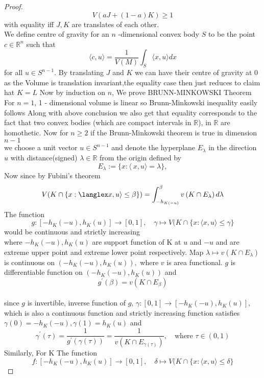 \documentclass[oneside]{book}
\begin{document}
\begin{proof}
\[
V(a J+(1-a) K) \geq 1
\]
with equality iff $J, K$ are translates of each other.
\\
 We define centre of gravity for an $n$ -dimensional convex body $S$ to be the point $c \in \mathbb{R}^{n}$ such that
\[
\langle c, u\rangle=\frac{1}{V(M)} \int_{S}\langle x, u\rangle d x
\]
for all $u \in S^{n-1} .$ \newpage
By translating  $J$ and $K$ we can have their centre of gravity at 0 as the Volume is translation invariant,the equality case then just reduces to claim hat $K=L$
\hfill \break
Now by induction on $n$, We prove  BRUNN-MINKOWSKI Theorem 
\hfill \break
For $n=1$, 1 - dimensional volume is linear so Brunn-Minkowski inequality easily follows 
\hfill \break 
Along with above conclusion we also get that equality corresponds to the fact that two convex bodies (which are compact intervals in $\mathbb{R}$), in $\mathbb{R}$  are homothetic.
\hfill \break 
Now for $n \geq 2$ if the Brunn-Minkowski theorem is true in dimension $n-1 $
\\
we choose a unit vector $u \in S^{n-1}$ and denote 
the hyperplane $E_{\lambda}$ in the direction $u$ with  distance(signed) $\lambda \in \mathbb{R} $ from the origin defined by 
\[
E_{\lambda}:=\{x:\langle\ x, u\rangle=\lambda\}, 
\]
Now since by Fubini's theorem  
\[
V(K \cap\{x: \langlex x, u\rangle \leq \beta\})=\int_{-h_{ K(-u)}}^{\beta} v\left(K \cap E_{\lambda}\right) d \lambda
\] 
The function
\[
g:\left[-h_{K}(-u), h_{K}(u)\right] \rightarrow[0,1], \quad \gamma \mapsto V(K \cap\{x:\langle x, u\rangle \leq  \gamma \}
\]
would be  continuous and strictly increasing\\
where $-h_{K}(-u), h_{K}(u)$ are support function of K at $u$ and $-u$ and are extreme upper point and extreme lower point respectively.
\hfill \break
  Map $\lambda \mapsto v\left(K \cap E_{\lambda}\right)$ is continuous on $\left(-h_{K}(-u), h_{K}(u)\right),$ where $v$ is area functional.
   $g$ is differentiable function on $\left(-h_{K}(-u), h_{K}(u)\right)$ and $$g^{\prime}(\beta)=v\left(K \cap E_{\beta}\right)$$
  \\
  since $g$ is invertible, inverse function of $g$, $ \gamma:[0,1] \rightarrow\left[-h_{K}(-u), h_{K}(u)\right],$ which is also a continuous function and strictly increasing  function satisfies $ \gamma(0)=-h_{K}(-u),  \gamma(1)=h_{K}(u)$ and
\[
 \gamma^{\prime}(\tau)=\frac{1}{g^{\prime}( \gamma(\tau))}=\frac{1}{v\left(K \cap E_{ \gamma(\tau)}\right)}, \quad  \text{where } \tau \in(0,1)
\]
Similarly, For K
The function
\[
f:\left[-h_{K}(-u), h_{K}(u)\right] \rightarrow[0,1], \quad \delta \mapsto V(K \cap\{x:\langle x, u\rangle \leq  \delta \}
\]
\end{proof}
\end{document}
